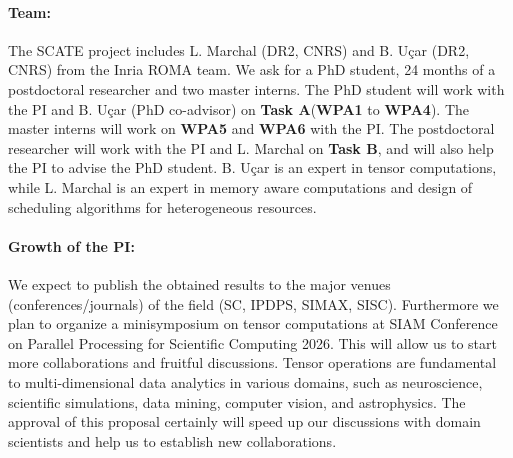 \documentclass[a4paper,11pt]{article}
\newcommand{\sk}[1]{{\color{blue} \emph{#1}}}
\begin{document}
	\vspace*{-0.25cm}\paragraph{Team:} The SCATE project includes L. Marchal (DR2, CNRS) and B. Uçar (DR2, CNRS) from the Inria ROMA team. We ask for a PhD student, 24 months of a postdoctoral researcher and two master interns. The PhD student will work with the PI and B. Uçar (PhD co-advisor) on \textbf{Task A}\newline (\textbf{WPA1} to \textbf{WPA4}). The master interns will work on \textbf{WPA5} and \textbf{WPA6} with the PI. The postdoctoral researcher will work with the PI and L. Marchal on \textbf{Task B}, and will also help the PI to advise the PhD student. B. Uçar is an expert in tensor computations, while L. Marchal is an expert in memory aware computations and design of scheduling algorithms for heterogeneous resources.
	


	
	
	\vspace*{-0.25cm}\paragraph{Growth of the PI:}
	We expect to publish the obtained results to the major venues (conferences/journals) of the field (SC, IPDPS, SIMAX, SISC). Furthermore we plan to organize a minisymposium on tensor computations at SIAM Conference on Parallel Processing for Scientific Computing 2026. This will allow us to start more collaborations and fruitful discussions. Tensor operations are fundamental to multi-dimensional data analytics in various domains, such as neuroscience, scientific simulations, data mining, computer vision, and astrophysics. The approval of this proposal certainly will speed up our discussions with domain scientists and help us to establish new collaborations. 
	
	
	
	
	\vspace*{-0.315cm}
	{\footnotesize
		
		
	}
	

%	
\end{document}

